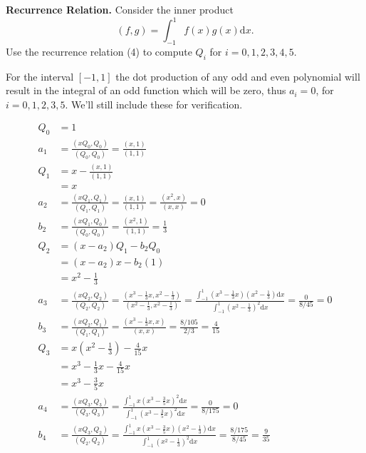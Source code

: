 \textbf{Recurrence Relation.} Consider the inner product \[(f,g) =
\int_{-1}^1 f(x) g(x) \mathrm{d}x.\] Use the recurrence relation (4)
to compute $Q_i$ for $i=0,1,2,3,4,5$.


{\color{blue}

For the interval $[-1, 1]$ the dot production of any odd and even
polynomial will result in the integral of an odd function which will
be zero, thus $a_i = 0$, for $i=0,1,2,3,5$. We'll still include these
for verification.

\begin{align*}
Q_0 &\boxed{= 1} \\
a_1 &= \frac{(x Q_0, Q_0)}{(Q_0, Q_0)} = \frac{(x,1)}{(1,1)} \\
Q_1 &= x - \frac{(x,1)}{(1,1)}\\
    &\boxed{= x} \\
a_2 &= \frac{(x Q_1, Q_1)}{(Q_1, Q_1)}
    = \frac{(x,1)}{(1,1)}
    = \frac{(x^2, x)}{(x,x)}
    = 0 \\
b_2 &=  \frac{(x Q_1, Q_0)}{(Q_0, Q_0)}
    =  \frac{(x^2, 1)}{(1,1)}
    =  \frac{1}{3} \\
Q_2 &= (x-a_2) Q_1 - b_2 Q_0 \\
    &= (x - a_2) x - b_2 (1) \\
    &\boxed{= x^2 - \frac{1}{3}} \\
a_3 &= \frac{(x Q_2, Q_2)} {(Q_2, Q_2)}
    = \frac{(x^3 - \frac{1}{3} x, x^2 - \frac{1}{3})}{(x^2 - \frac{1}{3}, x^2 - \frac{1}{3})}
    = \frac{\int_{-1}^1 (x^3 - \frac{1}{3} x) (x^2 - \frac{1}{3}) \textrm{d}x}{\int_{-1}^1 (x^2 - \frac{1}{3})^2 \textrm{d}x}
    = \frac{0}{8/45}
    = 0 \\
b_3 &= \frac{(x Q_2, Q_1)}{(Q_1, Q_1)}
    = \frac{(x^3 - \frac{1}{3}x, x)}{(x,x)}
    = \frac{8/105}{2/3}
    = \frac{4}{15} \\
Q_3 &= x(x^2 - \frac{1}{3}) - \frac{4}{15} x \\
    &= x^3 - \frac{1}{3} x - \frac{4}{15} x \\
    &\boxed{= x^3 - \frac{3}{5} x}\\
a_4 &= \frac{(x Q_3, Q_3)}{(Q_3, Q_3)}
    = \frac{\int_{-1}^1 x (x^3 - \frac{3}{5} x)^2 \textrm{d}x}{
    \int_{-1}^1 (x^3 - \frac{3}{5} x)^2 \textrm{d}x}
    = \frac{0}{8/175}
    = 0 \\
b_4 &= \frac{(x Q_3, Q_2)}{(Q_2, Q_2)}
    = \frac{\int_{-1}^1 x (x^3 - \frac{3}{5} x) (x^2 - \frac{1}{3}) \textrm{d}x}{\int_{-1}^1 (x^2 - \frac{1}{3})^2 \textrm{d}x}
    = \frac{8/175}{8/45}
    = \frac{9}{35} \\

\end{align*}}
